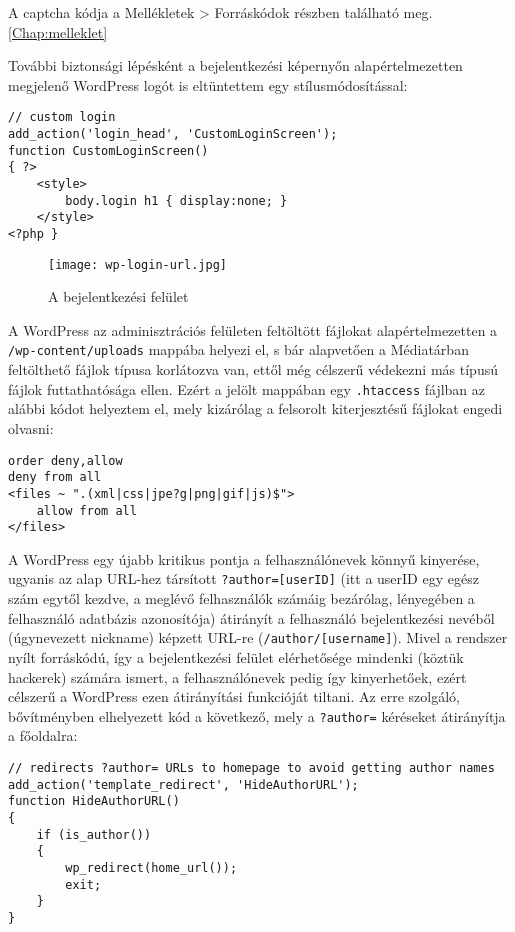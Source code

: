 A captcha kódja a Mellékletek > Forráskódok részben található meg. \ref{Chap:melleklet}

További biztonsági lépésként a bejelentkezési képernyőn alapértelmezetten megjelenő WordPress logót is eltüntettem egy stílusmódosítással:

\newpage

\begin{lstlisting}
// custom login
add_action('login_head', 'CustomLoginScreen');
function CustomLoginScreen()
{ ?>
	<style>
		body.login h1 { display:none; }
	</style>
<?php }
\end{lstlisting}

\begin{figure}
	\texttt{[image: wp-login-url.jpg]}
	\caption{A bejelentkezési felület}
\end{figure}

A WordPress az adminisztrációs felületen feltöltött fájlokat alapértelmezetten a \texttt{/wp-content/uploads} mappába helyezi el, s bár alapvetően a Médiatárban feltölthető fájlok típusa korlátozva van, ettől még célszerű védekezni más típusú fájlok futtathatósága ellen. Ezért a jelölt mappában egy \texttt{.htaccess} fájlban az alábbi kódot helyeztem el, mely kizárólag a felsorolt kiterjesztésű fájlokat engedi olvasni:

\begin{lstlisting}
order deny,allow
deny from all
<files ~ ".(xml|css|jpe?g|png|gif|js)$">
	allow from all
</files>
\end{lstlisting}

A WordPress egy újabb kritikus pontja a felhasználónevek könnyű kinyerése, ugyanis az alap URL-hez társított \texttt{?author=[userID]} (itt a userID egy egész szám egytől kezdve, a meglévő felhasználók számáig bezárólag, lényegében a felhasználó adatbázis azonosítója) átirányít a felhasználó bejelentkezési nevéből (úgynevezett nickname) képzett URL-re (\texttt{/author/[username]}). Mivel a rendszer nyílt forráskódú, így a bejelentkezési felület elérhetősége mindenki (köztük hackerek) számára ismert, a felhasználónevek pedig így kinyerhetőek, ezért célszerű a WordPress ezen átirányítási funkcióját tiltani. Az erre szolgáló, bővítményben elhelyezett kód a következő, mely a \verb|?author=| kéréseket átirányítja a főoldalra:

\begin{lstlisting}
// redirects ?author= URLs to homepage to avoid getting author names
add_action('template_redirect', 'HideAuthorURL');
function HideAuthorURL()
{
	if (is_author())
	{
		wp_redirect(home_url());
		exit;
	}
}
\end{lstlisting}

